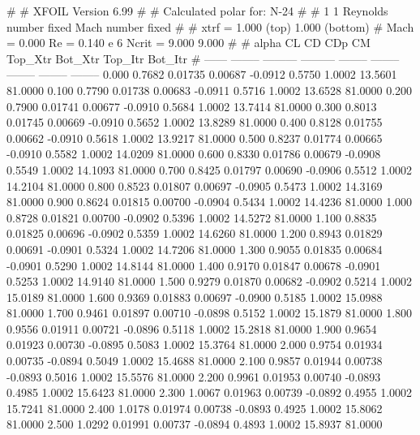 #  
#       XFOIL         Version 6.99
#  
# Calculated polar for: N-24                                            
#  
# 1 1 Reynolds number fixed          Mach number fixed         
#  
# xtrf =   1.000 (top)        1.000 (bottom)  
# Mach =   0.000     Re =     0.140 e 6     Ncrit =   9.000  9.000
#  
#   alpha    CL        CD       CDp       CM     Top_Xtr  Bot_Xtr  Top_Itr  Bot_Itr
#  ------ -------- --------- --------- -------- -------- -------- -------- --------
   0.000   0.7682   0.01735   0.00687  -0.0912   0.5750   1.0002  13.5601  81.0000
   0.100   0.7790   0.01738   0.00683  -0.0911   0.5716   1.0002  13.6528  81.0000
   0.200   0.7900   0.01741   0.00677  -0.0910   0.5684   1.0002  13.7414  81.0000
   0.300   0.8013   0.01745   0.00669  -0.0910   0.5652   1.0002  13.8289  81.0000
   0.400   0.8128   0.01755   0.00662  -0.0910   0.5618   1.0002  13.9217  81.0000
   0.500   0.8237   0.01774   0.00665  -0.0910   0.5582   1.0002  14.0209  81.0000
   0.600   0.8330   0.01786   0.00679  -0.0908   0.5549   1.0002  14.1093  81.0000
   0.700   0.8425   0.01797   0.00690  -0.0906   0.5512   1.0002  14.2104  81.0000
   0.800   0.8523   0.01807   0.00697  -0.0905   0.5473   1.0002  14.3169  81.0000
   0.900   0.8624   0.01815   0.00700  -0.0904   0.5434   1.0002  14.4236  81.0000
   1.000   0.8728   0.01821   0.00700  -0.0902   0.5396   1.0002  14.5272  81.0000
   1.100   0.8835   0.01825   0.00696  -0.0902   0.5359   1.0002  14.6260  81.0000
   1.200   0.8943   0.01829   0.00691  -0.0901   0.5324   1.0002  14.7206  81.0000
   1.300   0.9055   0.01835   0.00684  -0.0901   0.5290   1.0002  14.8144  81.0000
   1.400   0.9170   0.01847   0.00678  -0.0901   0.5253   1.0002  14.9140  81.0000
   1.500   0.9279   0.01870   0.00682  -0.0902   0.5214   1.0002  15.0189  81.0000
   1.600   0.9369   0.01883   0.00697  -0.0900   0.5185   1.0002  15.0988  81.0000
   1.700   0.9461   0.01897   0.00710  -0.0898   0.5152   1.0002  15.1879  81.0000
   1.800   0.9556   0.01911   0.00721  -0.0896   0.5118   1.0002  15.2818  81.0000
   1.900   0.9654   0.01923   0.00730  -0.0895   0.5083   1.0002  15.3764  81.0000
   2.000   0.9754   0.01934   0.00735  -0.0894   0.5049   1.0002  15.4688  81.0000
   2.100   0.9857   0.01944   0.00738  -0.0893   0.5016   1.0002  15.5576  81.0000
   2.200   0.9961   0.01953   0.00740  -0.0893   0.4985   1.0002  15.6423  81.0000
   2.300   1.0067   0.01963   0.00739  -0.0892   0.4955   1.0002  15.7241  81.0000
   2.400   1.0178   0.01974   0.00738  -0.0893   0.4925   1.0002  15.8062  81.0000
   2.500   1.0292   0.01991   0.00737  -0.0894   0.4893   1.0002  15.8937  81.0000
